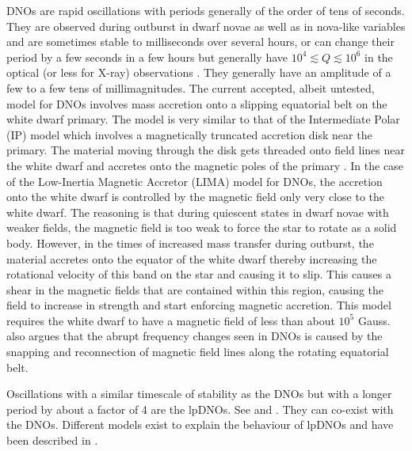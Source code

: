 DNOs are rapid oscillations with periods generally of the order of tens of seconds. They are observed during outburst in dwarf novae as well as in nova-like variables and are sometimes stable to milliseconds over several hours, or can change their period by a few seconds in a few hours but generally have $ 10^{4} \lesssim Q \lesssim 10^{6} $ in the optical (or less for X-ray) observations \citep{warner_ro2004}. They generally have an amplitude of a few to a few tens of millimagnitudes. The current accepted, albeit untested, model for DNOs involves mass accretion onto a slipping equatorial belt on the white dwarf primary. The model is very similar to that of the Intermediate Polar (IP) model which involves a magnetically truncated accretion disk near the primary. The material moving through the disk gets threaded onto field lines near the white dwarf and accretes onto the magnetic poles of the primary \citep{warnerbible}. In the case of the Low-Inertia Magnetic Accretor (LIMA) \citep{DNOQPO_II} model for DNOs, the accretion onto the white dwarf is controlled by the magnetic field only very close to the white dwarf. The reasoning is that during quiescent states in dwarf novae with weaker fields, the magnetic field is too weak to force the star to rotate as a solid body. However, in the times of increased mass transfer during outburst, the material accretes onto the equator of the white dwarf thereby increasing the rotational velocity of this band on the star and causing it to slip. This causes a shear in the magnetic fields that are contained within this region, causing the field to increase in strength \citep{DNOQPO_II} and start enforcing magnetic accretion. This model requires the white dwarf to have a magnetic field of less than about $10^{5}$ Gauss. \cite{DNOQPO_II} also argues that the abrupt frequency changes seen in DNOs is caused by the snapping and reconnection of magnetic field lines along the rotating equatorial belt.

Oscillations with a similar timescale of stability as the DNOs but with a longer period by about a factor of 4 are the lpDNOs. See \cite{warner_ro2004} and \cite{WWP}. They can co-exist with the DNOs. Different models exist to explain the behaviour of lpDNOs and have been described in \cite{DNOQPO_VI}.

